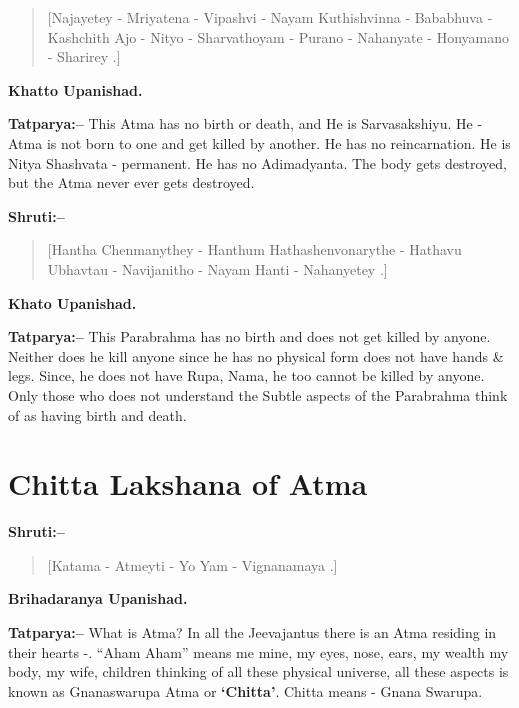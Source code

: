 \begin{verse}
[Najayetey - Mriyatena - Vipashvi - Nayam  Kuthishvinna - Bababhuva - Kashchith  Ajo - Nityo - Sharvathoyam - Purano - Nahanyate - Honyamano - Sharirey .]
\end{verse}

\begin{flushright}
\textbf{Khatto Upanishad.}
\end{flushright}

\vskip 2pt

\textbf{Tatparya:–} This Atma has no birth or death, and He is Sarvasakshiyu. He - Atma is not born to one and get killed by another. He has no reincarnation. He is Nitya Shashvata - permanent. He has no Adimadyanta. The body gets destroyed, but the Atma never ever gets destroyed.

\newpage

\textbf{Shruti:–}

\begin{verse}
[Hantha Chenmanythey - Hanthum Hathashenvonarythe - Hathavu Ubhavtau - Navijanitho - Nayam Hanti - Nahanyetey .]
\end{verse}

\begin{flushright}
\textbf{Khato Upanishad.}
\end{flushright}

\textbf{Tatparya:–} This Parabrahma has no birth and does not get killed by anyone. Neither does he kill anyone since he has no physical form does not have hands \& legs. Since, he does not have Rupa, Nama, he too cannot be killed by anyone. Only those who does not understand the Subtle aspects of the Parabrahma think of as having birth and death.

\chapter{Chitta Lakshana of Atma}

\textbf{Shruti:–}

\begin{verse}
[Katama - Atmeyti - Yo Yam - Vignanamaya .]
\end{verse}

\begin{flushright}
\textbf{Brihadaranya Upanishad.}
\end{flushright}

\textbf{Tatparya:–} What is Atma? In all the Jeevajantus there is an Atma residing in their hearts -. “Aham Aham” means me mine, my eyes, nose, ears, my wealth my body, my wife, children thinking of all these physical universe, all these aspects is known as Gnanaswarupa Atma or \textbf{‘Chitta’}. Chitta means - Gnana Swarupa.

